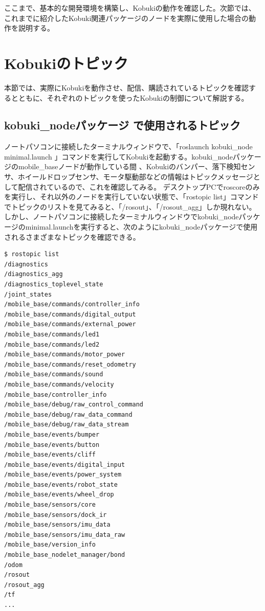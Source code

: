 \begin{itemize}
\begin{exercise}
\end{exercise}

ここまで、基本的な開発環境を構築し、Kobukiの動作を確認した。次節では、これまでに紹介したKobuki関連パッケージのノードを実際に使用した場合の動作を説明する。

\section{Kobukiのトピック}

本節では、実際にKobukiを動作させ、配信、購読されているトピックを確認するとともに、それぞれのトピックを使ったKobukiの制御について解説する。

\subsection{kobuki\_nodeパッケージ  で使用されるトピック}

ノートパソコンに接続したターミナルウィンドウで、「roslaunch kobuki\_node minimal.launch 」コマンドを実行してKobukiを起動する。kobuki\_nodeパッケージのmobile\_baseノードが動作している間 、Kobukiのバンパー、落下検知センサ、ホイールドロップセンサ、モータ駆動部などの情報はトピックメッセージとして配信されているので、これを確認してみる。
デスクトップPCでroscoreのみを実行し、それ以外のノードを実行していない状態で、「rostopic list」コマンドでトピックのリストを見てみると、「/rosout」、「/rosout\_agg」しか現れない。しかし、ノートパソコンに接続したターミナルウィンドウでkobuki\_nodeパッケージのminimal.launchを実行すると、次のようにkobuki\_nodeパッケージで使用されるさまざまなトピックを確認できる。

\begin{lstlisting}[language=ROS]
$ rostopic list
/diagnostics
/diagnostics_agg
/diagnostics_toplevel_state
/joint_states
/mobile_base/commands/controller_info
/mobile_base/commands/digital_output
/mobile_base/commands/external_power
/mobile_base/commands/led1
/mobile_base/commands/led2
/mobile_base/commands/motor_power
/mobile_base/commands/reset_odometry
/mobile_base/commands/sound
/mobile_base/commands/velocity
/mobile_base/controller_info
/mobile_base/debug/raw_control_command
/mobile_base/debug/raw_data_command
/mobile_base/debug/raw_data_stream
/mobile_base/events/bumper
/mobile_base/events/button
/mobile_base/events/cliff
/mobile_base/events/digital_input
/mobile_base/events/power_system
/mobile_base/events/robot_state
/mobile_base/events/wheel_drop
/mobile_base/sensors/core
/mobile_base/sensors/dock_ir
/mobile_base/sensors/imu_data
/mobile_base/sensors/imu_data_raw
/mobile_base/version_info
/mobile_base_nodelet_manager/bond
/odom
/rosout
/rosout_agg
/tf
...
\end{lstlisting}


\end{itemize}
